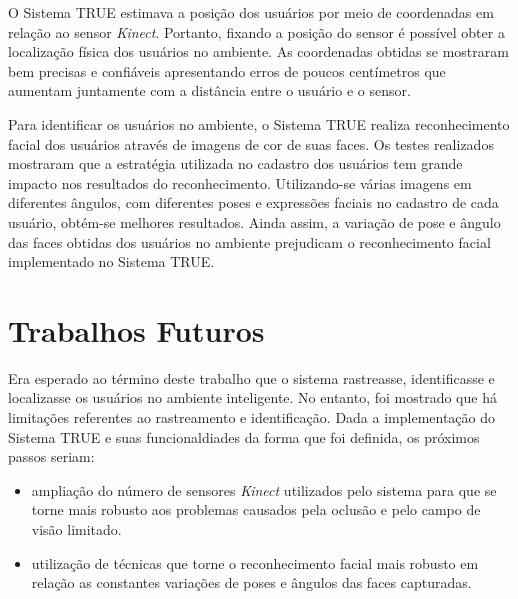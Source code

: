 O Sistema TRUE estimava a posição dos usuários por meio de coordenadas em relação ao sensor \textit{Kinect}. Portanto, fixando a posição do sensor é possível obter a localização física dos usuários no ambiente. As coordenadas obtidas se mostraram bem precisas e confiáveis apresentando erros de poucos centímetros que aumentam juntamente com a distância entre o usuário e o sensor. 

Para identificar os usuários no ambiente, o Sistema TRUE realiza reconhecimento
facial dos usuários através de imagens de cor de suas faces. Os testes
realizados mostraram que a estratégia utilizada no cadastro dos usuários tem
grande impacto nos resultados do reconhecimento. Utilizando-se várias imagens
em diferentes ângulos, com diferentes poses e expressões faciais no cadastro de
cada usuário, obtém-se melhores resultados. Ainda assim, a variação de pose e
ângulo das faces obtidas dos usuários no ambiente prejudicam o reconhecimento
facial implementado no Sistema TRUE.

\section{Trabalhos Futuros}

Era esperado ao término deste trabalho que o sistema rastreasse, identificasse e localizasse os usuários no ambiente inteligente. No entanto, foi mostrado que há limitações referentes ao rastreamento e identificação. Dada a implementação do Sistema TRUE e suas funcionaldiades da forma que foi definida, os próximos passos seriam:

\begin{itemize}
	\item ampliação do número de sensores \textit{Kinect} utilizados pelo sistema para que se torne mais robusto aos problemas causados pela oclusão e pelo campo de visão limitado.
	\item utilização de técnicas que torne o reconhecimento facial mais robusto em relação as constantes variações de poses e ângulos das faces capturadas.
\end{itemize}




